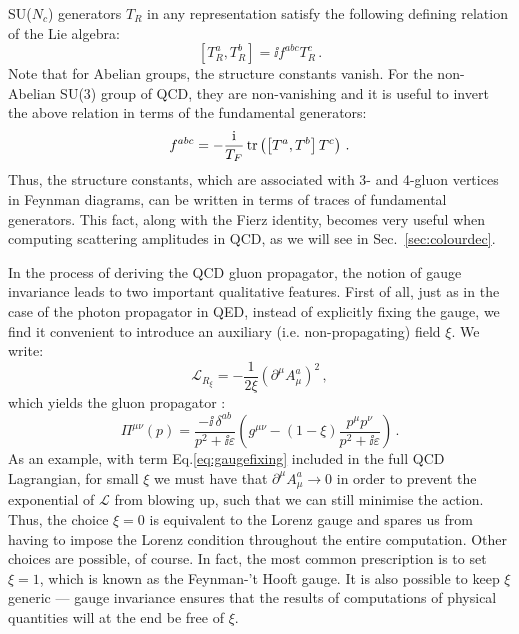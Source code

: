 \documentclass[main.tex]{subfiles}
\begin{document}
SU($N_c$) generators $T_R$ in any representation satisfy the following defining relation of the Lie algebra:
\begin{equation} \label{eq:liealgebra}
    \left[T_R^a, T_R^b\right] = \ii f^{abc} T_R^c\,.
\end{equation}
Note that for Abelian groups, the structure constants vanish. For the non-Abelian SU(3) group of QCD, they are non-vanishing and it is useful to invert the above relation in terms of the fundamental generators:
\begin{equation} \label{eq:fabc}
    f^{abc} = -\frac{\mathrm{i}}{T_F} \operatorname{\rm tr} \left(\left[T^a, T^b \right] T^c \right)\,.
\end{equation}
Thus, the structure constants, which are associated with 3- and 4-gluon vertices in Feynman diagrams, can be written in terms of traces of fundamental generators. This fact, along with the Fierz identity, becomes very useful when computing scattering amplitudes in QCD, as we will see in Sec.~\ref{sec:colourdec}.

In the process of deriving the QCD gluon propagator, the notion of gauge invariance leads to two important qualitative features. First of all, just as in the case of the photon propagator in QED, instead of explicitly fixing the gauge, we find it convenient to introduce an auxiliary (i.e. non-propagating) field $\xi$. We write:
\begin{equation} \label{eq:gaugefixing}
    \mathcal{L}_{R_\xi} = -\frac{1}{2 \xi} \left(\partial^\mu A^a_\mu \right)^2\,,
\end{equation}
which yields the gluon propagator :
\begin{equation}
    \Pi^{\mu\nu}(p) = \frac{-\ii \, \delta^{ab}}{p^2+ \ii \varepsilon} \left(g^{\mu\nu} - (1-\xi) \frac{p^\mu p^\nu}{p^2+\ii \varepsilon} \right)\,.
\end{equation}
As an example, with term Eq.\ref{eq:gaugefixing} included in the full QCD Lagrangian, for small $\xi$ we must have that $\partial^\mu A^a_\mu \rightarrow 0$ in order to prevent the exponential of $\mathcal{L}$ from blowing up, such that we can still minimise the action. Thus, the choice $\xi = 0$ is equivalent to the Lorenz gauge and spares us from having to impose the Lorenz condition throughout the entire computation. Other choices are possible, of course. In fact, the most common prescription is to set $\xi = 1$, which is known as the Feynman-'t Hooft gauge. It is also possible to keep $\xi$ generic --- gauge invariance ensures that the results of computations of physical quantities will at the end be free of $\xi$.
\end{document}
